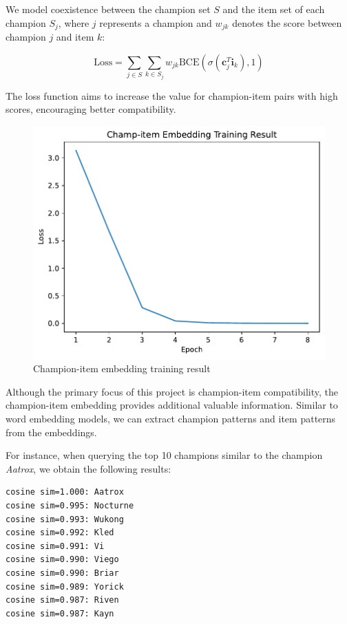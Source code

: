 \documentclass[11pt,a4paper,oneside]{report}
\begin{document}
We model coexistence between the champion set $S$ and the item set of each champion $S_j$, where $j$ represents a champion and $w_{jk}$ denotes the score between champion $j$ and item $k$:

\[\text{Loss} = \sum_{j \in S}\sum_{k \in S_j} w_{jk}\text{BCE}(\sigma(\mathbf{c}_j^T\mathbf{i}_k), 1)\]

The loss function aims to increase the value for champion-item pairs with high scores, encouraging better compatibility.

\begin{figure}[htbp]
  \centering
  \includegraphics[height=0.4\textheight]{assets/champ-item_embedding_training_result.pdf}
  \caption{Champion-item embedding training result}
  \label{fig:champ-item_embedding_training_result}
\end{figure}

Although the primary focus of this project is champion-item compatibility, the champion-item embedding provides additional valuable information. Similar to word embedding models, we can extract champion patterns and item patterns from the embeddings.

For instance, when querying the top 10 champions similar to the champion \textit{Aatrox}, we obtain the following results:

\begin{verbatim}
cosine sim=1.000: Aatrox
cosine sim=0.995: Nocturne
cosine sim=0.993: Wukong
cosine sim=0.992: Kled
cosine sim=0.991: Vi
cosine sim=0.990: Viego
cosine sim=0.990: Briar
cosine sim=0.989: Yorick
cosine sim=0.987: Riven
cosine sim=0.987: Kayn
\end{verbatim}
\end{document}
